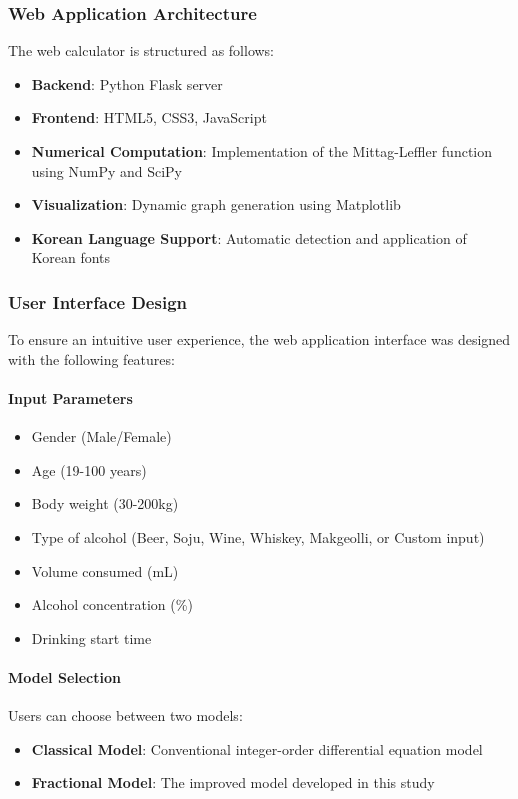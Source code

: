 \documentclass[11pt]{article}
\begin{document}
\subsubsection{Web Application Architecture}

The web calculator is structured as follows:

\begin{itemize}
    \item \textbf{Backend}: Python Flask server
    \item \textbf{Frontend}: HTML5, CSS3, JavaScript
    \item \textbf{Numerical Computation}: Implementation of the Mittag-Leffler function using NumPy and SciPy
    \item \textbf{Visualization}: Dynamic graph generation using Matplotlib
    \item \textbf{Korean Language Support}: Automatic detection and application of Korean fonts
\end{itemize}

\subsubsection{User Interface Design}

To ensure an intuitive user experience, the web application interface was designed with the following features:

\paragraph{Input Parameters}
\begin{itemize}
    \item Gender (Male/Female)
    \item Age (19-100 years)
    \item Body weight (30-200kg)
    \item Type of alcohol (Beer, Soju, Wine, Whiskey, Makgeolli, or Custom input)
    \item Volume consumed (mL)
    \item Alcohol concentration (\%)
    \item Drinking start time
\end{itemize}

\paragraph{Model Selection}
Users can choose between two models:
\begin{itemize}
    \item \textbf{Classical Model}: Conventional integer-order differential equation model
    \item \textbf{Fractional Model}: The improved model developed in this study
\end{itemize}
\end{document}
